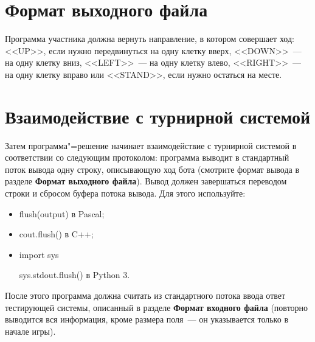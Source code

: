 \documentclass[a4paper,12pt]{article}
\begin{document}
\section*{Формат выходного файла}
Программа участника должна вернуть направление, в котором совершает ход: <<UP>>, если нужно передвинуться на одну клетку вверх, <<DOWN>>~--- на одну клетку вниз, <<LEFT>>~--- на одну клетку влево, <<RIGHT>>~--- на одну клетку вправо или <<STAND>>, если нужно остаться на месте.

\section*{Взаимодействие с турнирной системой}
Затем программа"=решение начинает взаимодействие с турнирной системой в соответствии со следующим протоколом:
программа выводит в стандартный поток вывода одну строку, описывающую ход бота (смотрите формат вывода в разделе \textbf{Формат выходного файла}). Вывод должен завершаться переводом строки и сбросом буфера потока
вывода. Для этого используйте:
\begin{itemize}
\item flush(output) в Pascal;
\item cout.flush() в C++;
\item import sys
      
      sys.stdout.flush() в Python 3.
\end{itemize}
После этого программа должна считать из стандартного потока ввода ответ тестирующей системы, описанный в разделе \textbf{Формат входного файла} (повторно выводится вся информация, кроме размера поля~--- он указывается только в начале игры).
\end{document}
